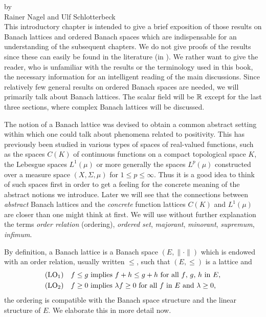 \label{chap:c1}%
\thispagestyle{empty}
{\Large
\vspace*{-.75cm}
by \\[.25em]
Rainer Nagel and Ulf Schlotterbeck
\vspace{.75cm}
\\
}
This introductory chapter is intended to give a brief exposition of those results on Banach lattices and ordered Banach spaces which are indispensable for an understanding of the subsequent chapters.
We do not give proofs of the results since these can easily be found in the literature (\eg in \textcite{schaefer:1974}).
We rather want to give the reader, who is unfamiliar with the results or the terminology used in this book, the necessary information for an intelligent reading of the main discussions.
Since relatively few general results on ordered Banach spaces are needed, we will primarily talk about Banach lattices.
The scalar field will be $\mathbb{R}$ except for the last three sections, where complex Banach lattices will be discussed.

The notion of a Banach lattice was devised to obtain a common abstract setting within which one could talk about phenomena related to positivity.
This has previously been studied in various types of spaces of real-valued functions, such as the spaces $ C(K) $ of continuous functions on a compact topological space $ K $, the Lebesgue spaces $ L^{1}(\mu) $ or more generally the spaces $ L^{p}(\mu) $ constructed over a measure space $ (X,\Sigma,\mu) $ for $ 1 \leq p \leq \infty $.
Thus it is a good idea to think of such spaces first in order to get a feeling for the concrete meaning of the abstract notions we introduce.
Later we will see that the connections between \emph{abstract} Banach lattices and the \emph{concrete} function lattices $ C(K) $ and $ L^{1}(\mu) $ are closer than one might think at first.
We will use without further explanation the terms \emph{order relation} (ordering), \emph{ordered set}, \emph{majorant}, \emph{minorant}, \emph{supremum}, \emph{infimum}.

By definition, a Banach lattice is a Banach space $ (E,\|\cdot\|) $ which is endowed with an order relation, usually written $ \leq $, such that $ (E,\leq) $ is a lattice and 
\begin{align*}
 &\text{(LO$_{1}$)} \quad \text{$f \leq g$ implies $f + h \leq g + h $
 	 for all $ f $, $ g $, $ h $ in  $ E $,}  \\
 &\text{(LO$_{2}$)} \quad \text{$f \geq 0$  implies   $\lambda f \geq 0$ for all $ f $ in $ E $ 
 	and  $\lambda \geq 0$,}
\end{align*}
\ie the ordering is compatible with the Banach space structure and the linear structure of\/ $ E $.
We elaborate this in more detail now.



